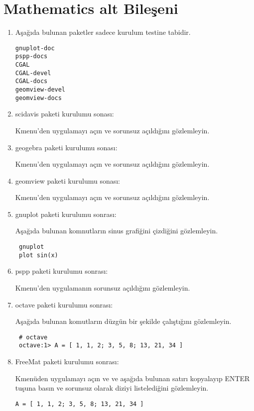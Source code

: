 \documentclass[a4paper,10pt]{article}
\begin{document}
\section{Mathematics alt Bileşeni}
\begin{enumerate}

\item Aşağıda bulunan paketler sadece kurulum testine tabidir.

\begin{verbatim}
gnuplot-doc
pspp-docs
CGAL
CGAL-devel
CGAL-docs
geomview-devel
geomview-docs
\end{verbatim}

\item scidavis paketi kurulumu sonası:

Kmenu'den uygulamayı açın ve sorunsuz açıldığını gözlemleyin.

\item geogebra paketi kurulumu sonası:

Kmenu'den uygulamayı açın ve sorunsuz açıldığını gözlemleyin.

\item geomview paketi kurulumu sonası:

Kmenu'den uygulamayı açın ve sorunsuz açıldığını gözlemleyin.

\item gnuplot paketi kurulumu sonrası:

Aşağıda bulunan komnutların sinus grafiğini çizdiğini gözlemleyin.

\begin{verbatim}
 gnuplot
 plot sin(x)
\end{verbatim}

\item pspp paketi kurulumu sonrası:

Kmenu'den uygulamanın sorunsuz açıldığını gözlemleyin.
\item octave paketi kurulumu sonrası:

Aşağıda bulunan komutların düzgün bir şekilde çalıştığını gözlemleyin.
\begin{verbatim}
 # octave 
 octave:1> A = [ 1, 1, 2; 3, 5, 8; 13, 21, 34 ]
\end{verbatim}

\item FreeMat paketi kurulumu sonrası:

Kmenüden uygulamayı açın ve ve aşağıda bulunan satırı kopyalayıp ENTER tuşuna basın ve sorunsuz olarak diziyi listelediğini gözlemleyin.
\begin{verbatim}
A = [ 1, 1, 2; 3, 5, 8; 13, 21, 34 ]
\end{verbatim}




\end{enumerate}
\end{document}
